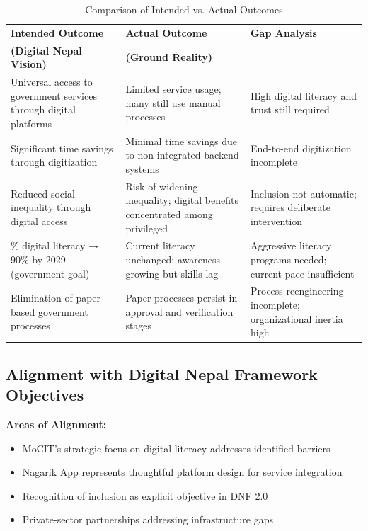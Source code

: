 \documentclass[12pt,a4paper]{article}
\begin{document}
\begin{table}[ht]
\centering
\small
\caption{Comparison of Intended vs. Actual Outcomes}
\vspace{6pt}
\begin{tabular}{@{}p{4.2cm}p{4.2cm}p{4.8cm}@{}}
\toprule
\textbf{Intended Outcome} & \textbf{Actual Outcome} & \textbf{Gap Analysis} \\
\textbf{(Digital Nepal Vision)} & \textbf{(Ground Reality)} & \\
\midrule
Universal access to government services through digital platforms & Limited service usage; many still use manual processes & High digital literacy and trust still required \\
\addlinespace
Significant time savings through digitization & Minimal time savings due to non-integrated backend systems & End-to-end digitization incomplete \\
\addlinespace
Reduced social inequality through digital access & Risk of widening inequality; digital benefits concentrated among privileged & Inclusion not automatic; requires deliberate intervention \\
\addlinespace
31\% digital literacy → 90\% by 2029 (government goal) & Current literacy unchanged; awareness growing but skills lag & Aggressive literacy programs needed; current pace insufficient \\
\addlinespace
Elimination of paper-based government processes & Paper processes persist in approval and verification stages & Process reengineering incomplete; organizational inertia high \\
\bottomrule
\end{tabular}
\end{table}

\subsection{Alignment with Digital Nepal Framework Objectives}

\textbf{Areas of Alignment:}
\begin{itemize}
    \item MoCIT's strategic focus on digital literacy addresses identified barriers
    \item Nagarik App represents thoughtful platform design for service integration
    \item Recognition of inclusion as explicit objective in DNF 2.0
    \item Private-sector partnerships addressing infrastructure gaps
\end{itemize}
\end{document}
